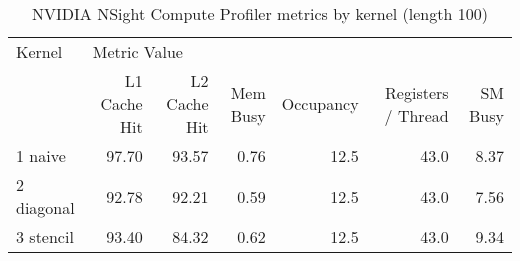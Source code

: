 \begin{table}[htbp]
\centering
\caption{NVIDIA NSight Compute Profiler metrics by kernel (length 100)}
\label{prof_table}
\begin{tabular}{lrrrrrr}
\toprule
    Kernel & \multicolumn{6}{l}{Metric Value} \\
           & L1 Cache Hit & L2 Cache Hit & Mem Busy & Occupancy & Registers / Thread & SM Busy \\
\midrule
   1 naive &        97.70 &        93.57 &     0.76 &      12.5 &               43.0 &    8.37 \\
2 diagonal &        92.78 &        92.21 &     0.59 &      12.5 &               43.0 &    7.56 \\
 3 stencil &        93.40 &        84.32 &     0.62 &      12.5 &               43.0 &    9.34 \\
\bottomrule
\end{tabular}
\end{table}
